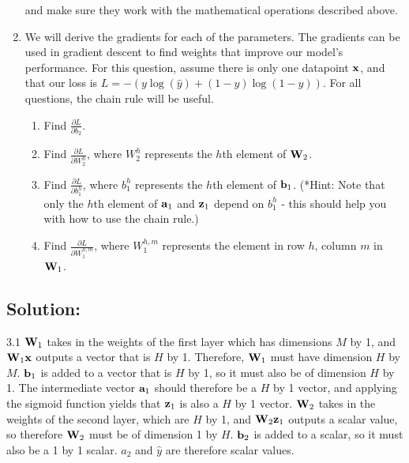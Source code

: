 \documentclass[submit]{harvardml}
\begin{document}
\begin{problem}
\begin{enumerate}
      and make sure they work with the mathematical operations described above.
      
    \item  We will derive the gradients for each of the parameters.  The gradients can be used in gradient descent to find weights that improve our model's performance. For this question, assume there is only one datapoint $\bold{x}$, and that our loss is $L = -(y \log (\hat{y}) + (1 - y) \log (1 - \hat{y}))$. For all questions, the chain rule will be useful.
    \begin{enumerate}
        \item Find $\frac{\partial L}{\partial b_2}$. 
        
        \item Find $\frac{\partial L}{\partial W_2^h}$, where $W_2^h$ represents the $h$th element of $\bold{W}_2$.
        
        \item Find $\frac{\partial L}{\partial b_1^h}$, where $b_1^h$ represents the $h$th element of $\bold{b}_1$. (*Hint: Note that only the $h$th element of $\bold{a}_1$ and $\bold{z}_1$ depend on $b_1^h$ - this should help you with how to use the chain rule.)
        
        \item Find $\frac{\partial L}{\partial W_1^{h,m}}$, where  $W_1^{h,m}$ represents the element in row $h$, column $m$ in $\bold{W}_1$.
    
    \end{enumerate}
    \end{enumerate}
    
    \end{problem}

\subsection*{Solution:}
3.1 $\bold{W}_1$ takes in the weights of the first layer which has dimensions $M$ by 1, and $\bold{W}_1 \bold{x}$ outputs a vector that is $H$ by 1. Therefore, $\bold{W}_1$ must have dimension $H$ by $M$. $\bold{b}_1$ is added to a vector that is $H$ by 1, so it must also be of dimension $H$ by 1. The intermediate vector $\bold{a}_1$ should therefore be a $H$ by 1 vector, and applying the sigmoid function yields that $\bold{z}_1$ is also a $H$ by 1 vector. $\bold{W}_2$ takes in the weights of the second layer, which are $H$ by 1, and $\bold{W}_2 \bold{z}_1$ outputs a scalar value, so therefore $\bold{W}_2$ must be of dimension 1 by $H$. $\bold{b}_2$ is added to a scalar, so it must also be a 1 by 1 scalar. $a_2$ and $\hat{y}$ are therefore scalar values.
\end{document}
